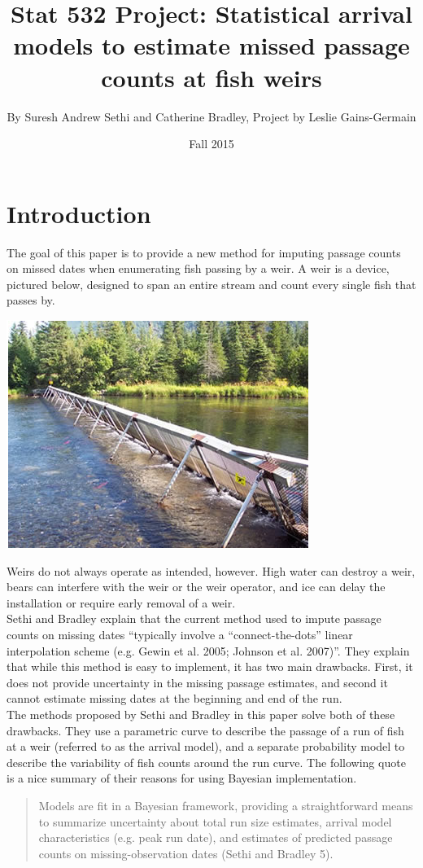 \documentclass[12pt]{article}\usepackage[]{graphicx}\usepackage[]{color}
\title{\vspace{-2.0cm} Stat 532 Project: Statistical arrival models to estimate missed passage counts at fish weirs}
\author{By Suresh Andrew Sethi and Catherine Bradley, Project by Leslie Gains-Germain}
\date{Fall 2015}
\begin{document}
\maketitle
\tableofcontents

\newpage

\section{Introduction}

The goal of this paper is to provide a new method for imputing passage counts on missed dates when enumerating fish passing by a weir. A weir is a device, pictured below, designed to span an entire stream and count every single fish that passes by. 

\begin{center}
\includegraphics[scale=0.5]{weir.png}
\end{center}

\noindent Weirs do not always operate as intended, however. High water can destroy a weir, bears can interfere with the weir or the weir operator, and ice can delay the installation or require early removal of a weir. \\

\noindent Sethi and Bradley explain that the current method used to impute passage counts on missing dates ``typically involve a ``connect-the-dots'' linear interpolation scheme (e.g. Gewin et al. 2005; Johnson et al. 2007)''. They explain that while this method is easy to implement, it has two main drawbacks. First, it does not provide uncertainty in the missing passage estimates, and second it cannot estimate missing dates at the beginning and end of the run. \\

\noindent The methods proposed by Sethi and Bradley in this paper solve both of these drawbacks. They use a parametric curve to describe the passage of a run of fish at a weir (referred to as the arrival model), and a separate probability model to describe the variability of fish counts around the run curve. The following quote is a nice summary of their reasons for using Bayesian implementation.
\begin{quote}
Models are fit in a Bayesian framework, providing a straightforward means to summarize uncertainty about total run size estimates, arrival model characteristics (e.g. peak run date), and estimates of predicted passage counts on missing-observation dates (Sethi and Bradley 5).
\end{quote}
\end{document}
